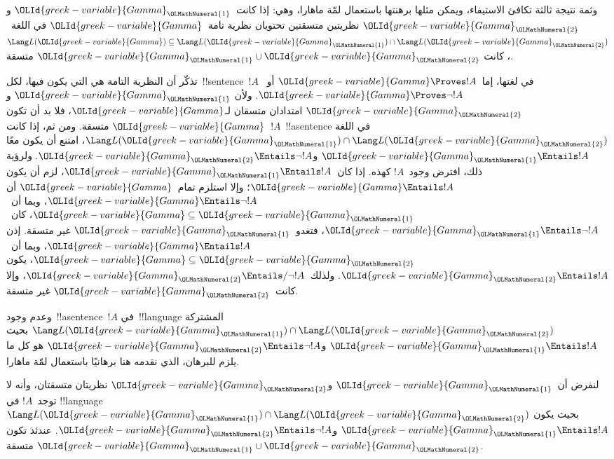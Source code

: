 \documentclass[../../../include/open-logic-section]{subfiles}
\begin{document}
وثمة نتيجة ثالثة تكافئ الاستيفاء، ويمكن مثلها برهنتها باستعمال لمّة
ماهارا، وهي: إذا كانت~$\OLId{greek-variable}{Gamma}_\OLMathNumeral{1}$ و$\OLId{greek-variable}{Gamma}_\OLMathNumeral{2}$ نظريتين متسقتين تحتويان
نظرية تامة~$\OLId{greek-variable}{Gamma}$ في اللغة~$\Lang L(\OLId{greek-variable}{Gamma}) \subseteq
\Lang L(\OLId{greek-variable}{Gamma}_\OLMathNumeral{1}) \cap \Lang L(\OLId{greek-variable}{Gamma}_\OLMathNumeral{2})$، كانت
$\OLId{greek-variable}{Gamma}_\OLMathNumeral{1} \cup \OLId{greek-variable}{Gamma}_\OLMathNumeral{2}$ متسقة.

تذكّر أن النظرية التامة هي التي يكون فيها، لكل~!!{sentence}~$!A$ في
لغتها، إما~$\OLId{greek-variable}{Gamma} \Proves !A$ أو~$\OLId{greek-variable}{Gamma} \Proves \lnot !A$. ولأن
$\OLId{greek-variable}{Gamma}_\OLMathNumeral{1}$ و$\OLId{greek-variable}{Gamma}_\OLMathNumeral{2}$ امتدادان متسقان لـ$\OLId{greek-variable}{Gamma}$، فلا بد أن تكون
$\OLId{greek-variable}{Gamma}$ متسقة. ومن ثم، إذا كانت~$!A$~!!a{sentence} في اللغة
$\Lang L(\OLId{greek-variable}{Gamma}_\OLMathNumeral{1}) \cap \Lang L(\OLId{greek-variable}{Gamma}_\OLMathNumeral{2})$، امتنع أن يكون معًا
$\OLId{greek-variable}{Gamma}_\OLMathNumeral{1} \Entails !A$ و$\OLId{greek-variable}{Gamma}_\OLMathNumeral{2} \Entails \lnot !A$. ولرؤية ذلك،
افترض وجود~$!A$ كهذه. إذا كان~$\OLId{greek-variable}{Gamma}_\OLMathNumeral{1} \Entails !A$، لزم أن يكون
$\OLId{greek-variable}{Gamma} \Entails !A$؛ وإلا استلزم تمام~$\OLId{greek-variable}{Gamma}$ أن
$\OLId{greek-variable}{Gamma} \Entails \lnot !A$، وبما أن~$\OLId{greek-variable}{Gamma} \subseteq \OLId{greek-variable}{Gamma}_\OLMathNumeral{1}$،
كان~$\OLId{greek-variable}{Gamma}_\OLMathNumeral{1} \Entails \lnot !A$، فتغدو~$\OLId{greek-variable}{Gamma}_\OLMathNumeral{1}$ غير متسقة. إذن
$\OLId{greek-variable}{Gamma} \Entails !A$، وبما أن~$\OLId{greek-variable}{Gamma} \subseteq \OLId{greek-variable}{Gamma}_\OLMathNumeral{2}$، يكون
$\OLId{greek-variable}{Gamma}_\OLMathNumeral{2} \Entails !A$. ولذلك~$\OLId{greek-variable}{Gamma}_\OLMathNumeral{2} \Entails/ \lnot !A$، وإلا
كانت~$\OLId{greek-variable}{Gamma}_\OLMathNumeral{2}$ غير متسقة.

وعدم وجود~!!a{sentence}~$!A$ في~!!{language} المشتركة
$\Lang L(\OLId{greek-variable}{Gamma}_\OLMathNumeral{1}) \cap \Lang L(\OLId{greek-variable}{Gamma}_\OLMathNumeral{2})$ بحيث
$\OLId{greek-variable}{Gamma}_\OLMathNumeral{1} \Entails !A$ و$\OLId{greek-variable}{Gamma}_\OLMathNumeral{2} \Entails \lnot !A$ هو كل ما يلزم
للبرهان، الذي نقدمه هنا برهانيًا باستعمال لمّة ماهارا.

\begin{thm}
لنفرض أن~$\OLId{greek-variable}{Gamma}_\OLMathNumeral{1}$ و$\OLId{greek-variable}{Gamma}_\OLMathNumeral{2}$ نظريتان متسقتان، وأنه لا توجد~$!A$ في
!!{language}~$\Lang L(\OLId{greek-variable}{Gamma}_\OLMathNumeral{1}) \cap \Lang L(\OLId{greek-variable}{Gamma}_\OLMathNumeral{2})$ بحيث يكون
$\OLId{greek-variable}{Gamma}_\OLMathNumeral{1} \Entails !A$ و$\OLId{greek-variable}{Gamma}_\OLMathNumeral{2} \Entails \lnot !A$. عندئذ تكون
$\OLId{greek-variable}{Gamma}_\OLMathNumeral{1} \cup \OLId{greek-variable}{Gamma}_\OLMathNumeral{2}$ متسقة.
\end{thm}
\end{document}

